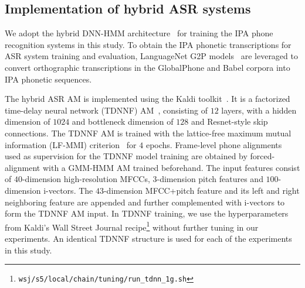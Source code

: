 \documentclass{article}
\begin{document}




\subsection{Implementation of hybrid ASR systems}
We adopt the hybrid DNN-HMM architecture~\cite{dahl2012context} for training the IPA phone recognition systems in this study. 
To obtain the IPA phonetic transcriptions for ASR system training and evaluation, LanguageNet G2P models~\cite{hasegawa2020grapheme} are leveraged to convert orthographic transcriptions in the GlobalPhone and Babel corpora into IPA phonetic sequences. 




The hybrid ASR AM is implemented using the Kaldi toolkit~\cite{povey2011kaldi}. 
It is a factorized time-delay neural network (TDNNF) AM~\cite{povey2018semi}, consisting of $12$ layers, with a hidden dimension of $1024$ and bottleneck dimension of $128$ and Resnet-style skip connections. The TDNNF AM is trained with the lattice-free maximum mutual information (LF-MMI) criterion~\cite{povey2016purely} for $4$ epochs. Frame-level phone alignments used as supervision for the TDNNF model training are obtained by forced-alignment with a GMM-HMM AM trained beforehand. The input features consist of $40$-dimension high-resolution MFCCs, $3$-dimension pitch features \cite{ghahremani2014pitch} and $100$-dimension i-vectors. The $43$-dimension MFCC+pitch feature and its left and right neighboring feature are appended and further complemented with i-vectors to form the TDNNF AM input. 
In TDNNF training, we use the hyperparameters from Kaldi's Wall Street Journal recipe\footnote{\texttt{wsj/s5/local/chain/tuning/run\_tdnn\_1g.sh}} without further tuning in our experiments. An identical TDNNF structure is used for each of the experiments in this study.
\end{document}
